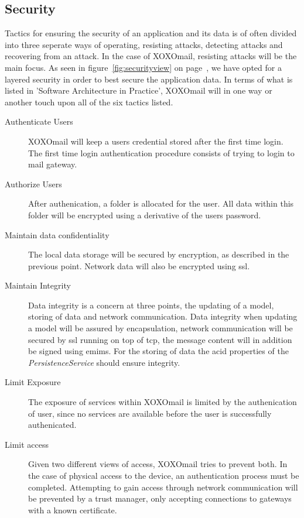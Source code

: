 	\subsection{Security}
		Tactics for ensuring the security of an application and its data is of often divided into three seperate ways of operating, resisting attacks, detecting attacks and recovering from an attack. 
		In the case of XOXOmail, resisting attacks will be the main focus. As seen in figure~\ref{fig:securityview} on page~\pageref{fig:securityview}, we have opted for a layered security in order to best secure the application data. In terms of what is listed in 'Software Architecture in Practice'\cite[p. 119]{bib:archi}, XOXOmail will in one way or another touch upon all of the six tactics listed. 
		\begin{description}
			\item[Authenticate Users] XOXOmail will keep a users credential stored after the first time login. The first time login authentication procedure consists of trying to login to mail gateway.
			\item[Authorize Users] After authenication, a folder is allocated for the user. All data within this folder will be encrypted using a derivative of the users password. 
			\item[Maintain data confidentiality] The local data storage will be secured by encryption, as described in the previous point. Network data will also be encrypted using \gls{ssl}. 
			\item[Maintain Integrity] Data integrity is a concern at three points, the updating of a model, storing of data and network communication. Data integrity when updating a model will be assured by encapsulation, network communication will be secured by \gls{ssl} running on top of \gls{tcp}, the message content will in addition be signed using \gls{emims}. For the storing of data the \gls{acid} properties of the \textit{PersistenceService} should ensure integrity. 
			\item[Limit Exposure] The exposure of services within XOXOmail is limited by the authenication of user, since no services are available before the user is successfully authenicated.
			\item[Limit access] Given two different views of access, XOXOmail tries to prevent both. In the case of physical access to the device, an authentication process must be completed. Attempting to gain access through network communication will be prevented by a trust manager, only accepting connections to gateways with a known certificate. 
		\end{description}
		
